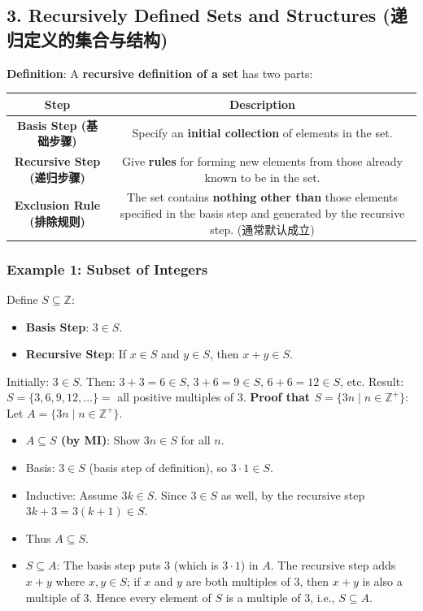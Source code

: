 \documentclass[10pt,a4paper,openany]{ctexbook}
\theoremstyle{definition}
\theoremstyle{remark}
\begin{document}
\vspace{-2pt}

\subsection{3. Recursively Defined Sets and Structures (递归定义的集合与结构)}

\textbf{Definition}: A \textbf{recursive definition of a set} has two parts:
\begin{center}
\begin{tabular}{cc}
\hline
Step & Description \\ \hline
\textbf{Basis Step (基础步骤)} & Specify an \textbf{initial collection} of elements in the set. \\
\textbf{Recursive Step (递归步骤)} & Give \textbf{rules} for forming new elements from those already known to be in the set. \\
\textbf{Exclusion Rule (排除规则)} & The set contains \textbf{nothing other than} those elements specified in the basis step and generated by the recursive step. (通常默认成立) \\
\hline
\end{tabular}

\end{center}

\subsubsection{Example 1: Subset of Integers}

Define $S \subseteq \mathbb{Z}$:
\begin{itemize}
\item \textbf{Basis Step}: $3 \in S$.
\item \textbf{Recursive Step}: If $x \in S$ and $y \in S$, then $x + y \in S$.

\end{itemize}

Initially: $3 \in S$.
Then: $3+3=6 \in S$, $3+6=9 \in S$, $6+6=12 \in S$, etc.
Result: $S = \{3, 6, 9, 12, \dots\} =$ all positive multiples of 3.
\textbf{Proof that $S = \{3n \mid n \in \mathbb{Z}^+\}$}:
Let $A = \{3n \mid n \in \mathbb{Z}^+\}$.
\begin{itemize}
\item \textbf{$A \subseteq S$ (by MI)}: Show $3n \in S$ for all $n$.
\item Basis: $3 \in S$ (basis step of definition), so $3 \cdot 1 \in S$.
\item Inductive: Assume $3k \in S$. Since $3 \in S$ as well, by the recursive step $3k + 3 = 3(k+1) \in S$.
\item Thus $A \subseteq S$.

\item \textbf{$S \subseteq A$}: The basis step puts $3$ (which is $3 \cdot 1$) in $A$. The recursive step adds $x+y$ where $x,y \in S$; if $x$ and $y$ are both multiples of $3$, then $x+y$ is also a multiple of $3$. Hence every element of $S$ is a multiple of $3$, i.e., $S \subseteq A$.

\end{itemize}
\end{document}
